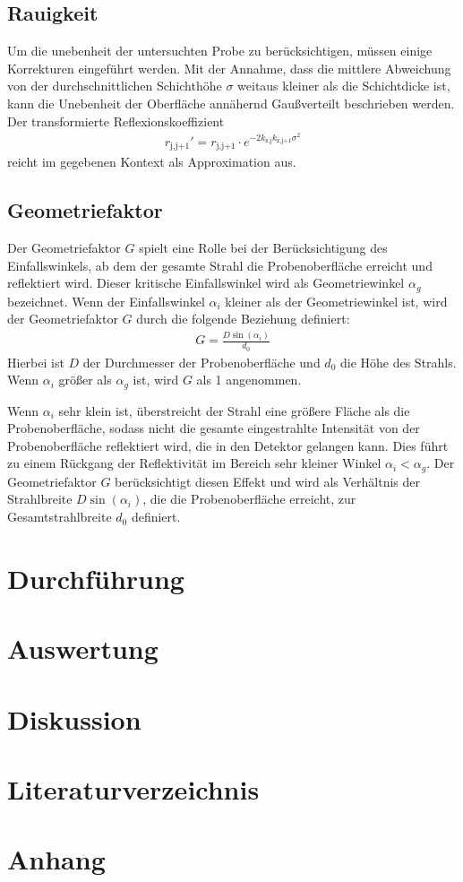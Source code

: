 \documentclass[12pt]{article}
\begin{document}
\subsection{Rauigkeit}{\label{subsec:rauigkeit}}
Um die unebenheit der untersuchten Probe zu berücksichtigen, müssen einige Korrekturen eingeführt werden.
Mit der Annahme, dass die mittlere Abweichung von der durchschnittlichen Schichthöhe $\sigma$ weitaus kleiner als die Schichtdicke ist, kann die Unebenheit der Oberfläche annähernd Gaußverteilt beschrieben werden.
Der transformierte Reflexionskoeffizient
\begin{align}
    r_\text{j,j+1}'=r_\text{j,j+1}\cdot e^{-2k_\text{z,j}k_\text{z,j+1}\sigma^2}
\end{align}
reicht im gegebenen Kontext als Approximation aus.
\subsection{Geometriefaktor}
Der Geometriefaktor $ G $ spielt eine Rolle bei der Berücksichtigung des Einfallswinkels, ab dem der gesamte Strahl die Probenoberfläche erreicht und reflektiert wird. Dieser kritische Einfallswinkel wird als Geometriewinkel $ \alpha_g $ bezeichnet. Wenn der Einfallswinkel $ \alpha_i $ kleiner als der Geometriewinkel ist, wird der Geometriefaktor $ G $ durch die folgende Beziehung definiert:
\begin{align*}
G = \frac{D \sin(\alpha_i)}{d_0}
\end{align*}
Hierbei ist $ D $ der Durchmesser der Probenoberfläche und $ d_0 $ die Höhe des Strahls. Wenn $ \alpha_i $ größer als $ \alpha_g $ ist, wird $ G $ als 1 angenommen.

Wenn $ \alpha_i $ sehr klein ist, überstreicht der Strahl eine größere Fläche als die Probenoberfläche, sodass nicht die gesamte eingestrahlte Intensität von der Probenoberfläche reflektiert wird, die in den Detektor gelangen kann. Dies führt zu einem Rückgang der Reflektivität im Bereich sehr kleiner Winkel $ \alpha_i < \alpha_g $. Der Geometriefaktor $ G $ berücksichtigt diesen Effekt und wird als Verhältnis der Strahlbreite $ D \sin(\alpha_i) $, die die Probenoberfläche erreicht, zur Gesamtstrahlbreite $ d_0 $ definiert.

\section{Durchführung}{\label{sec:durchfuehrung}}
\section{Auswertung}\label{sec:auswertung}

\section{Diskussion}\label{sec:diskussion}

\section{Literaturverzeichnis}\label{sec:literaturverzeichnis}
\printbibliography[heading = none]
\newpage

\section{Anhang}\label{sec:anhang}
\end{document}
